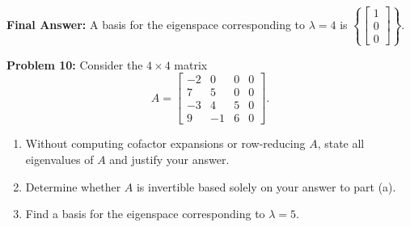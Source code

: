 \documentclass[11pt, letterpaper]{article}
\theoremstyle{definition}
\theoremstyle{remark}
\begin{document}
\textbf{Final Answer:} A basis for the eigenspace corresponding to $\lambda = 4$ is $\left\{ \begin{bmatrix} 1 \\ 0 \\ 0 \end{bmatrix} \right\}$.

\vspace{0.4em}
\textbf{Problem 10:}
Consider the $4 \times 4$ matrix
\[
A = \begin{bmatrix} -2 & 0 & 0 & 0 \\ 7 & 5 & 0 & 0 \\ -3 & 4 & 5 & 0 \\ 9 & -1 & 6 & 0 \end{bmatrix}.
\]
\begin{enumerate}[label=(\alph*)]
    \item Without computing cofactor expansions or row-reducing $A$, state all eigenvalues of $A$ and justify your answer.
    \item Determine whether $A$ is invertible based solely on your answer to part (a).
    \item Find a basis for the eigenspace corresponding to $\lambda = 5$.
\end{enumerate}
\end{document}
